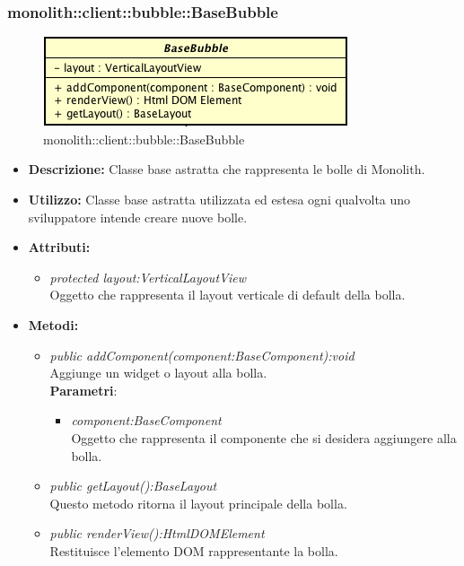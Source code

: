 \subsubsection{monolith::client::bubble::BaseBubble}

\label{monolith::client::bubble::BaseBubble}
\begin{figure}[H]
	\centering
	\includegraphics[scale=0.5]{Sezioni/SottosezioniST/img/BaseBubble.png}
	\caption{monolith::client::bubble::BaseBubble}
\end{figure}

\begin{itemize}
\item \textbf{Descrizione:} Classe base astratta che rappresenta le bolle di Monolith.
\item \textbf{Utilizzo:} Classe base astratta utilizzata ed estesa ogni qualvolta uno sviluppatore intende creare nuove bolle.
\item \textbf{Attributi:} 
\begin{itemize}
\item \textit{protected layout:VerticalLayoutView}\\
Oggetto che rappresenta il layout verticale di default della bolla.
\end{itemize}
\item \textbf{Metodi:}
\begin{itemize}
	\item \textit{public addComponent(component:BaseComponent):void}\\
Aggiunge un widget o layout alla bolla.
		  \\ \textbf{Parametri}: \begin{itemize}
				\item \textit{component:BaseComponent}\\
					Oggetto che rappresenta il componente che si desidera aggiungere alla bolla.
			\end{itemize}
	\item \textit{public getLayout():BaseLayout}\\
Questo metodo ritorna il layout principale della bolla.
	\item \textit{public renderView():HtmlDOMElement}\\
Restituisce l'elemento DOM rappresentante la bolla.
\end{itemize}
\end{itemize}

